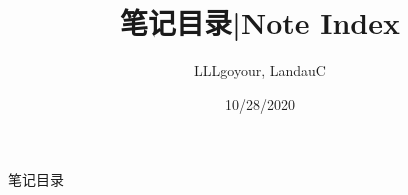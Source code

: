 \documentclass{article}
\title{笔记目录|Note Index}
\author{LLLgoyour, LandauC}
\date{10/28/2020}
\begin{document}
 

笔记目录
\end{document}

